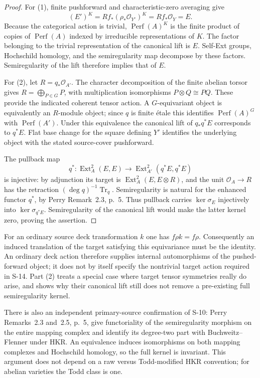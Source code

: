 \begin{proof}
For (1), finite pushforward and characteristic-zero averaging give
\[
 (E')^K
 =Rf_*(\rho_*\mathcal O_{Y'})^K
 =Rf_*\mathcal O_Y=E.
\]
Because the categorical action is trivial,
$\operatorname{Perf}(A)^K$ is the finite product of copies of
$\operatorname{Perf}(A)$ indexed by irreducible representations
of $K$. The factor belonging to the trivial representation of
the canonical lift is $E$. Self-Ext groups, Hochschild homology,
and the semiregularity map decompose by these factors.
Semiregularity of the lift therefore implies that of $E$.

For (2), let $R=q_*\mathcal O_{A'}$. The character decomposition
of the finite abelian torsor gives
$R=\bigoplus_{P\in G}P$, with multiplication isomorphisms
$P\otimes Q\cong PQ$. These provide the indicated coherent
tensor action. A $G$-equivariant object is equivalently an
$R$-module object; since $q$ is finite \'etale this identifies
$\operatorname{Perf}(A)^G$ with $\operatorname{Perf}(A')$.
Under this equivalence the canonical lift of $q_*q^*E$
corresponds to $q^*E$.
Flat base change for the square defining $Y'$ identifies the
underlying object with the stated source-cover pushforward.

The pullback map
\[
 q^*:\operatorname{Ext}^2_A(E,E)
 \longrightarrow
 \operatorname{Ext}^2_{A'}(q^*E,q^*E)
\]
is injective: by adjunction its target is
$\operatorname{Ext}^2_A(E,E\otimes R)$, and the unit
$\mathcal O_A\to R$ has the retraction
$(\deg q)^{-1}\operatorname{Tr}_q$.
Semiregularity is natural for the enhanced functor $q^*$,
by Perry Remark~2.3, p.~5. Thus pullback carries
$\ker\sigma_E$ injectively into $\ker\sigma_{q^*E}$.
Semiregularity of the canonical lift would make the latter
kernel zero, proving the assertion.
\end{proof}

For an ordinary source deck transformation $k$ one has
$f\rho k=f\rho$. Consequently an induced translation of the
target satisfying this equivariance must be the identity.
An ordinary deck action therefore supplies internal
automorphisms of the pushed-forward object; it does not by
itself specify the nontrivial target action required in S-14.
Part (2) treats a special case where target tensor symmetries
really do arise, and shows why their canonical lift still
does not remove a pre-existing full semiregularity kernel.

There is also an independent primary-source confirmation of S-10:
Perry Remarks~2.3 and~2.5, p.~5, give functoriality of the
semiregularity morphism on the entire mapping complex and identify
its degree-two part with Buchweitz--Flenner under HKR.
An equivalence induces isomorphisms on both mapping complexes and
Hochschild homology, so the full kernel is invariant. This argument
does not depend on a raw versus Todd-modified HKR convention;
for abelian varieties the Todd class is one.

